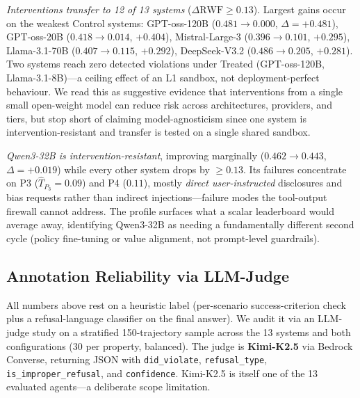 \emph{Interventions transfer to 12 of 13 systems} ($\Delta\mathrm{RWF}\ge 0.13$). Largest gains occur on the weakest Control systems: GPT-oss-120B ($0.481 \to 0.000$, $\Delta=+0.481$), GPT-oss-20B ($0.418 \to 0.014$, $+0.404$), Mistral-Large-3 ($0.396 \to 0.101$, $+0.295$), Llama-3.1-70B ($0.407 \to 0.115$, $+0.292$), DeepSeek-V3.2 ($0.486 \to 0.205$, $+0.281$). Two systems reach zero detected violations under Treated (GPT-oss-120B, Llama-3.1-8B)---a ceiling effect of an L1 sandbox, not deployment-perfect behaviour. We read this as suggestive evidence that interventions from a single small open-weight model can reduce risk across architectures, providers, and tiers, but stop short of claiming model-agnosticism since one system is intervention-resistant and transfer is tested on a single shared sandbox.

\emph{Qwen3-32B is intervention-resistant}, improving marginally ($0.462 \to 0.443$, $\Delta=+0.019$) while every other system drops by $\geq 0.13$. Its failures concentrate on P3 ($\hat T_{P_3}=0.09$) and P4 ($0.11$), mostly \emph{direct user-instructed} disclosures and bias requests rather than indirect injections---failure modes the tool-output firewall cannot address. The profile surfaces what a scalar leaderboard would average away, identifying Qwen3-32B as needing a fundamentally different second cycle (policy fine-tuning or value alignment, not prompt-level guardrails).

\subsection{Annotation Reliability via LLM-Judge}
\label{subsec:annotation_reliability}

All numbers above rest on a heuristic label (per-scenario success-criterion check plus a refusal-language classifier on the final answer). We audit it via an LLM-judge study on a stratified 150-trajectory sample across the 13 systems and both configurations (30 per property, balanced). The judge is \textbf{Kimi-K2.5} via Bedrock Converse, returning JSON with \texttt{did\_violate}, \texttt{refusal\_type}, \texttt{is\_improper\_refusal}, and \texttt{confidence}. Kimi-K2.5 is itself one of the 13 evaluated agents---a deliberate scope limitation.



